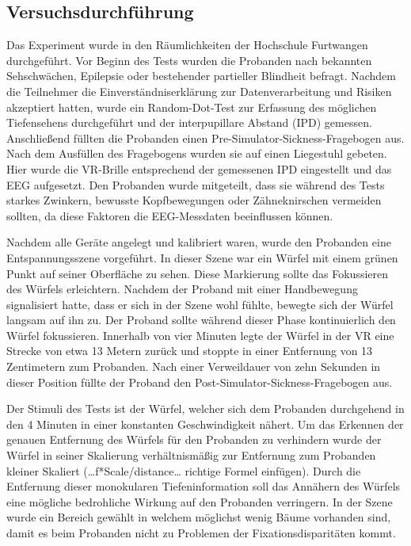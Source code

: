 \documentclass[conference]{IEEEtran}
\begin{document}
\subsection{Versuchsdurchführung}
Das Experiment wurde in den Räumlichkeiten der Hochschule Furtwangen durchgeführt. Vor Beginn des Tests wurden die Probanden nach bekannten Sehschwächen, Epilepsie oder bestehender partieller Blindheit befragt. Nachdem die Teilnehmer die Einverständniserklärung zur Datenverarbeitung und Risiken akzeptiert hatten, wurde ein Random-Dot-Test zur Erfassung des möglichen Tiefensehens durchgeführt und der interpupillare Abstand (IPD) gemessen. Anschließend füllten die Probanden einen Pre-Simulator-Sickness-Fragebogen aus. Nach dem Ausfüllen des Fragebogens wurden sie auf einen Liegestuhl gebeten. Hier wurde die VR-Brille entsprechend der gemessenen IPD eingestellt und das EEG aufgesetzt. Den Probanden wurde mitgeteilt, dass sie während des Tests starkes Zwinkern, bewusste Kopfbewegungen oder Zähneknirschen vermeiden sollten, da diese Faktoren die EEG-Messdaten beeinflussen können.

Nachdem alle Geräte angelegt und kalibriert waren, wurde den Probanden eine Entspannungsszene vorgeführt. In dieser Szene war ein Würfel mit einem grünen Punkt auf seiner Oberfläche zu sehen. Diese Markierung sollte das Fokussieren des Würfels erleichtern. Nachdem der Proband mit einer Handbewegung signalisiert hatte, dass er sich in der Szene wohl fühlte, bewegte sich der Würfel langsam auf ihn zu. Der Proband sollte während dieser Phase kontinuierlich den Würfel fokussieren. Innerhalb von vier Minuten legte der Würfel in der VR eine Strecke von etwa 13 Metern zurück und stoppte in einer Entfernung von 13 Zentimetern zum Probanden. Nach einer Verweildauer von zehn Sekunden in dieser Position füllte der Proband den Post-Simulator-Sickness-Fragebogen aus.

Der Stimuli des Tests ist der Würfel, welcher sich dem Probanden durchgehend in den 4 Minuten in einer konstanten Geschwindigkeit nähert. Um das Erkennen der genauen Entfernung des Würfels für den Probanden zu verhindern wurde der Würfel in seiner Skalierung verhältnismäßig zur Entfernung zum Probanden kleiner Skaliert (…f*Scale/distance… richtige Formel einfügen). Durch die Entfernung dieser monokularen Tiefeninformation soll das Annähern des Würfels eine mögliche bedrohliche Wirkung auf den Probanden verringern. In der Szene wurde ein Bereich gewählt in welchem möglichst wenig Bäume  vorhanden sind, damit es beim Probanden nicht zu Problemen der Fixationsdisparitäten kommt.
\end{document}
